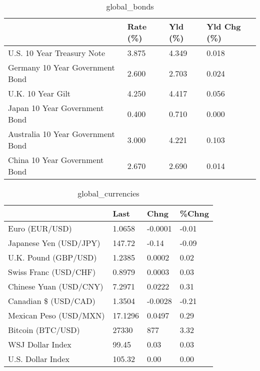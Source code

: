\documentclass{article}%
\begin{document}
%


\begin{table}[htbp]%
\caption{global\_bonds}%
\centering%
\begin{adjustbox}{width=1\textwidth}%
\begin{tabular}{llll}
\toprule
                                  & Rate (\%) & Yld (\%) & Yld Chg (\%) \\
\midrule
       U.S. 10 Year Treasury Note &    3.875 &   4.349 &       0.018 \\
  Germany 10 Year Government Bond &    2.600 &   2.703 &       0.024 \\
                U.K. 10 Year Gilt &    4.250 &   4.417 &       0.056 \\
    Japan 10 Year Government Bond &    0.400 &   0.710 &       0.000 \\
Australia 10 Year Government Bond &    3.000 &   4.221 &       0.103 \\
    China 10 Year Government Bond &    2.670 &   2.690 &       0.014 \\
\bottomrule
\end{tabular}
%
\end{adjustbox}%
\end{table}

%


\begin{table}[htbp]%
\caption{global\_currencies}%
\centering%
\begin{adjustbox}{width=1\textwidth}%
\begin{tabular}{llll}
\toprule
                       &    Last &    Chng & \%Chng \\
\midrule
        Euro (EUR/USD) &  1.0658 & -0.0001 & -0.01 \\
Japanese Yen (USD/JPY) &  147.72 &   -0.14 & -0.09 \\
  U.K. Pound (GBP/USD) &  1.2385 &  0.0002 &  0.02 \\
 Swiss Franc (USD/CHF) &  0.8979 &  0.0003 &  0.03 \\
Chinese Yuan (USD/CNY) &  7.2971 &  0.0222 &  0.31 \\
  Canadian \$ (USD/CAD) &  1.3504 & -0.0028 & -0.21 \\
Mexican Peso (USD/MXN) & 17.1296 &  0.0497 &  0.29 \\
     Bitcoin (BTC/USD) &   27330 &     877 &  3.32 \\
      WSJ Dollar Index &   99.45 &    0.03 &  0.03 \\
     U.S. Dollar Index &  105.32 &    0.00 &  0.00 \\
\bottomrule
\end{tabular}
%
\end{adjustbox}%
\end{table}
\end{document}
